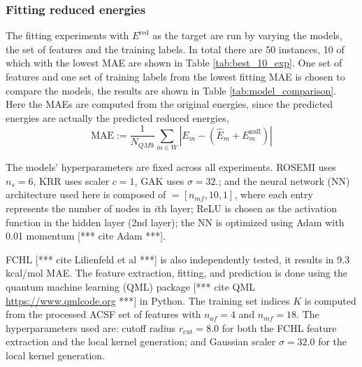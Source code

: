 \documentclass[12pt]{article}
\def\att{                    %
        \marginpar[ \hspace*{\fill} \raisebox{-0.2em}{\rule{2mm}{1.2em}} ]
        {\raisebox{-0.2em}{\rule{2mm}{1.2em}} }
        }
\def\at#1{[*** \att #1 ***]}  %
\begin{document}
\subsubsection{Fitting reduced energies}
The fitting experiments with $E^\text{red}$ as the target are run by varying the models, the set of features and the training labels. In total there are 50 instances, 10 of which with the lowest MAE are shown in Table \ref{tab:best_10_exp}.
One set of features and one set of training labels from the lowest fitting MAE is chosen to compare the models, the results are shown in Table \ref{tab:model_comparison}. Here the MAEs are computed from the original energies, since the predicted energies are actually the predicted reduced energies,
\begin{equation}
	\text{MAE} := \frac{1}{N_{QM9}}\sum_{m \in W}|E_{m} - (\hat{E}_m + E^\text{null}_m)|
\end{equation}

The models' hyperparameters are fixed across all experiments. ROSEMI uses $n_s = 6$, KRR uses scaler $c=1$, GAK uses $\sigma = 32.$; and the neural network (NN) architecture used here is composed of $ = [n_{mf}, 10, 1]$, where each entry represents the number of nodes in $i$th layer; ReLU is chosen as the activation function in the hidden layer (2nd layer); the NN is optimized using Adam with 0.01 momentum \at{cite Adam}. 

FCHL \at{cite Lilienfeld et al} is also independently tested, it results in 9.3 kcal/mol MAE. The feature extraction, fitting, and prediction is done using the quantum machine learning (QML) package \at{cite QML \url{https://www.qmlcode.org}} in Python. 
The training set indices $K$ is computed from the processed ACSF set of features with $n_{af} = 4$ and $n_{mf} = 18$.
The hyperparameters used are: cutoff radius $r_\text{cut} = 8.0$ for both the FCHL feature extraction and the local kernel generation; and Gaussian scaler $\sigma = 32.0$ for the local kernel generation.
\end{document}
